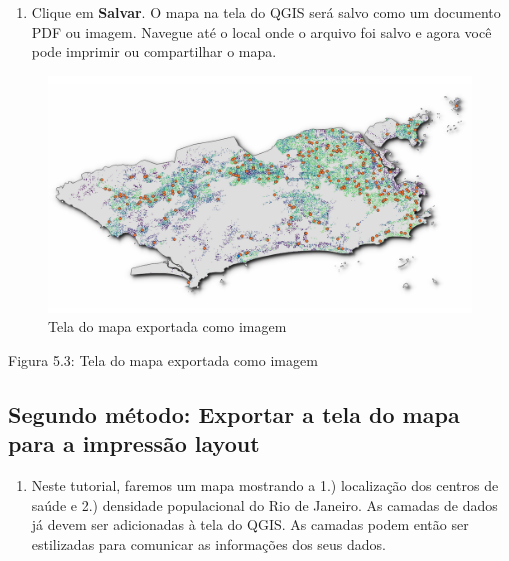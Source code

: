 \documentclass[
]{krantz}
\providecommand{\tightlist}{%
  \setlength{\itemsep}{0pt}\setlength{\parskip}{0pt}}
\begin{document}
\begin{enumerate}
\def\labelenumi{\arabic{enumi}.}
\setcounter{enumi}{2}
\tightlist
\item
  Clique em \textbf{Salvar}. O mapa na tela do QGIS será salvo como um documento PDF ou imagem. Navegue até o local onde o arquivo foi salvo e agora você pode imprimir ou compartilhar o mapa.
\end{enumerate}

\begin{figure}
\centering
\includegraphics{media/modulo5/exported-map-canvas.png}
\caption{Tela do mapa exportada como imagem}
\end{figure}

Figura 5.3: Tela do mapa exportada como imagem

\hypertarget{segundo-muxe9todo-exportar-a-tela-do-mapa-para-a-impressuxe3o-layout}{%
\subsection{Segundo método: Exportar a tela do mapa para a impressão layout}\label{segundo-muxe9todo-exportar-a-tela-do-mapa-para-a-impressuxe3o-layout}}

\begin{enumerate}
\def\labelenumi{\arabic{enumi}.}
\tightlist
\item
  Neste tutorial, faremos um mapa mostrando a 1.) localização dos centros de saúde e 2.) densidade populacional do Rio de Janeiro. As camadas de dados já devem ser adicionadas à tela do QGIS. As camadas podem então ser estilizadas para comunicar as informações dos seus dados.
\end{enumerate}
\end{document}
